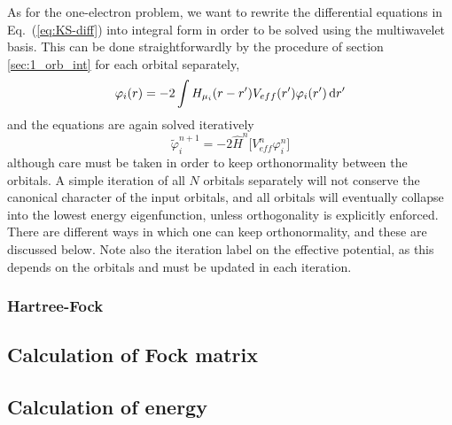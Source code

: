 As for the one-electron problem, we want to rewrite the differential 
equations in Eq.~(\ref{eq:KS-diff}) into integral form in order to be 
solved using the multiwavelet basis. This can be done straightforwardly
by the procedure of section \ref{sec:1_orb_int} for each orbital separately, 
\begin{equation}
    \label{eq:KS-int}
    \varphi_i(r) = -2\int H_{\mu_i}(r-r')V_{eff}(r') \varphi_i(r') \,\mathrm{d} r'
\end{equation}
and the equations are again solved iteratively
\begin{equation}
    \label{eq:KS-iter}
    \tilde{\varphi}^{n+1}_i = -2 \hat{H}^n\big[V^n_{eff}\varphi^n_i\big]
\end{equation}
although care must be taken in order to keep orthonormality between the 
orbitals. A simple iteration of all $N$ orbitals separately will not 
conserve the canonical character of the input orbitals, and all orbitals 
will eventually collapse into the lowest energy eigenfunction, unless 
orthogonality is explicitly enforced. There are different ways in which 
one can keep orthonormality, and these are discussed below. Note also the
iteration label on the effective potential, as this depends on the orbitals 
and must be updated in each iteration.

\subsubsection{Hartree-Fock}
\subsection{Calculation of Fock matrix}
\subsection{Calculation of energy}

